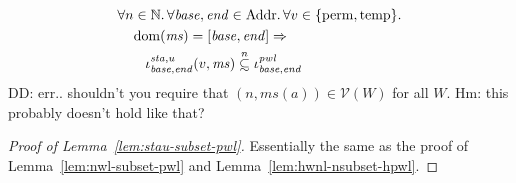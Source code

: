 \documentclass[a4paper]{article}
\newcommand\subsetsim{\mathrel{\ooalign{\raise.2ex\hbox{$\subset$}\cr
      \hidewidth\lower.8ex\hbox{\scalebox{0.9}{$\sim$}}\hidewidth\cr}}}
\newcommand{\nsubsim}[1][n]{\stackrel{\tiny{#1}}{\subsetsim}}
\DeclareMathOperator{\dom}{dom}
\newcommand\dominique[1]{{\color{purple} \sf \footnotesize {DD: #1}}\\}
\newcommand{\var}[1]{\mathit{#1}}
\newcommand{\hs}{\var{ms}}
\newcommand{\ms}{\hs}
\newcommand{\start}{\var{base}}
\newcommand{\addrend}{\var{end}}
\newcommand{\pwl}{\var{pwl}}
\newcommand{\sta}{\var{sta}}
\newcommand{\asmType}{\plaindom{AsmType}}
\newcommand{\plaindom}[1]{\mathrm{#1}}
\newcommand{\Addrs}{\plaindom{Addr}}
\newcommand{\nats}{\mathbb{N}}
\newcommand{\intr}[2]{\mathcal{#1}}
\newcommand{\valueintr}[1]{\intr{V}{#1}}
\newcommand{\stdvr}{\valueintr{\asmType}}
\newcommand{\npair}[2][n]{\left(#1,#2 \right)}
\newcommand{\plainview}[1]{\mathrm{#1}}
\newcommand{\perma}{\plainview{perm}}
\newcommand{\temp}{\plainview{temp}}
\begin{document}
\begin{lemma}
  \label{lem:stau-subset-pwl}
  \begin{align*}
    & \forall n \in \nats\ldotp \forall \start, \addrend \in \Addrs \ldotp \forall v \in \{\perma, \temp\} \ldotp \\
    & \quad \dom(\ms) = [\start,\addrend] \Rightarrow \\
    & \qquad \iota^{\sta,u}_{\start,\addrend}(v,\ms) \nsubsim \iota^\pwl_{\start,\addrend}
  \end{align*}
  \dominique{err.. shouldn't you require that $\npair{\ms(a)}\in\stdvr(W)$ for
    all $W$.  Hm: this probably doesn't hold like that?}
\end{lemma}
\begin{proof}[Proof of Lemma~\ref{lem:stau-subset-pwl}]
  Essentially the same as the proof of Lemma~\ref{lem:nwl-subset-pwl} and Lemma~\ref{lem:hwnl-nsubset-hpwl}.
\end{proof}
\end{document}
